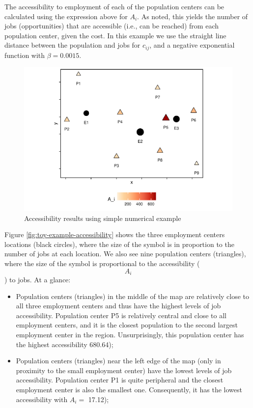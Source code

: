 \documentclass[]{elsarticle} %
\begin{document}
The accessibility to employment of each of the population centers can be
calculated using the expression above for \(A_i\). As noted, this yields
the number of jobs (opportunities) that are accessible (i.e., can be
reached) from each population center, given the cost. In this example we
use the straight line distance between the population and jobs for
\(c_{ij}\), and a negative exponential function with \(\beta = 0.0015\).

\begin{figure}
\includegraphics[width=1\linewidth]{Spatial-Availability_files/figure-latex/toy-example-accessibility-plot-1} \caption{\label{fig:toy-example-accessibility}Accessibility results using simple numerical example}\label{fig:toy-example-accessibility-plot}
\end{figure}

Figure \ref{fig:toy-example-accessibility} shows the three employment
centers locations (black circles), where the size of the symbol is in
proportion to the number of jobs at each location. We also see nine
population centers (triangles), where the size of the symbol is
proportional to the accessibility (\[A_i\]) to jobs. At a glance:

\begin{itemize}
\item
  Population centers (triangles) in the middle of the map are relatively
  close to all three employment centers and thus have the highest levels
  of job accessibility. Population center P5 is relatively central and
  close to all employment centers, and it is the closest population to
  the second largest employment center in the region. Unsurprisingly,
  this population center has the highest accessibility 680.64);
\item
  Population centers (triangles) near the left edge of the map (only in
  proximity to the small employment center) have the lowest levels of
  job accessibility. Population center P1 is quite peripheral and the
  closest employment center is also the smallest one. Consequently, it
  has the lowest accessibility with \(A_i=\) 17.12);
\end{itemize}
\end{document}
